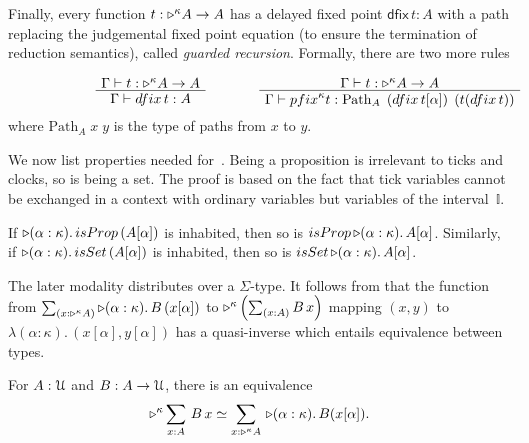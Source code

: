 \documentclass[a4paper,UKenglish,numberwithinsect,cleveref,thm-restate,draft]{lipics-v2021}
\numberwithin{equation}{section}
\theoremstyle{definition}
\theoremstyle{plain}
\begin{document}
  Finally, every function $t : \mathord{\triangleright}^\kappa A \to A$ has a delayed fixed point $\mathsf{dfix}\,t : A$ with a path replacing the judgemental fixed point equation (to ensure the termination of reduction semantics), called \emph{guarded recursion}.
Formally, there are two more rules
\[
  \begin{minipage}{0.47\linewidth}
    \begin{prooftree}
      \AxiomC{$\Gamma \vdash t : \laterp^\kappa A \to A$}
      \UnaryInfC{$\Gamma \vdash \mathsf{dfix}\,t : A$}
    \end{prooftree}
  \end{minipage}
  \begin{minipage}{0.47\linewidth}
    \begin{prooftree}
      \AxiomC{$\Gamma \vdash t : \laterp^\kappa A \to A$}
      \UnaryInfC{$\Gamma \vdash \mathsf{pfix}^\kappa t : \mathrm{Path}_A\;\left(\mathsf{dfix}\,t[\alpha]\right)\;\left(t(\mathsf{dfix}\,t)\right)$}
    \end{prooftree}
  \end{minipage}
\]
where $\mathrm{Path}_A\;x\;y$ is the type of paths from $x$ to $y$.

We now list properties needed for~.
Being a proposition is irrelevant to ticks and clocks, so is being a set.
The proof is based on the fact that tick variables cannot be exchanged in a context with ordinary variables but  variables of the interval~$\mathbb{I}$.
\begin{lemma}
  If $\laterp (\alpha : \kappa).\, \mathsf{isProp}\,(A [\alpha])$ is inhabited, then so is $\mathsf{isProp}\,\laterp(\alpha: \kappa).\, A [\alpha]$. 
  Similarly, if $\laterp (\alpha : \kappa).\, \mathsf{isSet}\,(A [\alpha])$ is inhabited, then so is $\mathsf{isSet}\,\laterp(\alpha: \kappa).\, A [\alpha]$. 
\end{lemma}

The later modality distributes over a $\Sigma$-type.
It follows from that the function from $\sm{x : \laterp^\kappa A} \laterp (\alpha : \kappa).\, B\,(x[\alpha])$ to $\laterp^\kappa \left(\sm{x : A} B\,x\right)$ mapping $(x, y)$ to $\lambda (\alpha : \kappa).\, (x[\alpha], y[\alpha])$ has a quasi-inverse which entails equivalence between types.
\begin{lemma}\label{lem:later-sum}
  For $A : \mathcal{U}$ and $B : A \to \mathcal{U}$, there is an equivalence
  \begin{equation}\label{eq:later-sum}
    \eqv{\laterp^\kappa \sm{x : A} B\,x}{\sm{x : \laterp^\kappa A} \laterp (\alpha : \kappa).\, B (x [\alpha])}.
  \end{equation}
\end{lemma}
\end{document}
